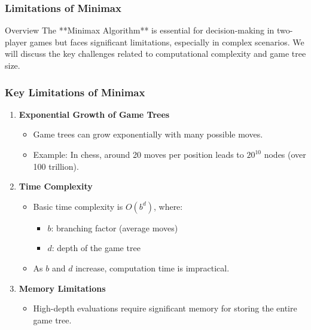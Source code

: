 \documentclass[aspectratio=169]{beamer}
\begin{document}
\begin{frame}
    \frametitle{Limitations of Minimax}
    \begin{block}{Overview}
        The **Minimax Algorithm** is essential for decision-making in two-player games but faces significant limitations, especially in complex scenarios. We will discuss the key challenges related to computational complexity and game tree size.
    \end{block}
\end{frame}

\begin{frame}
    \frametitle{Key Limitations of Minimax}
    \begin{enumerate}
        \item \textbf{Exponential Growth of Game Trees}
        \begin{itemize}
            \item Game trees can grow exponentially with many possible moves.
            \item Example: In chess, around 20 moves per position leads to $20^{10}$ nodes (over 100 trillion).
        \end{itemize}
        
        \item \textbf{Time Complexity}
        \begin{itemize}
            \item Basic time complexity is $O(b^d)$, where:
            \begin{itemize}
                \item $b$: branching factor (average moves)
                \item $d$: depth of the game tree
            \end{itemize}
            \item As $b$ and $d$ increase, computation time is impractical.
        \end{itemize}
        
        \item \textbf{Memory Limitations}
        \begin{itemize}
            \item High-depth evaluations require significant memory for storing the entire game tree.
        \end{itemize}
    \end{enumerate}
\end{frame}
\end{document}
